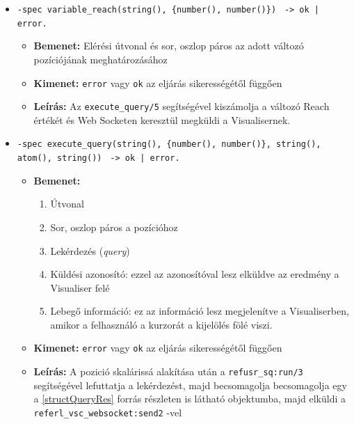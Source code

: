 \begin{itemize}
    
    \item \lstinline|-spec variable_reach(string(), {number(), number()})| \lstinline{ -> ok | error.}
    \begin{itemize}
        \item \textbf{Bemenet:} Elérési útvonal és sor, oszlop páros az adott változó pozíciójának meghatározásához
        \item \textbf{Kimenet:} \lstinline{error} vagy \lstinline{ok} az eljárás sikerességétől függően
        \item \textbf{Leírás:} Az \lstinline{execute_query/5} segítségével kiszámolja a változó Reach értékét és Web Socketen keresztül megküldi a Visualisernek.
    \end{itemize}
    \item \lstinline|-spec execute_query(string(), {number(), number()}, string(), atom(), string())| \lstinline{ -> ok | error.}
    \begin{itemize}
        \item \textbf{Bemenet:}
        \begin{enumerate}
            \item Útvonal
            \item Sor, oszlop páros a pozícióhoz
            \item Lekérdezés (\textit{query})
            \item Küldési azonosító: ezzel az azonosítóval lesz elküldve az eredmény a Visualiser felé
            \item Lebegő információ: ez az információ lesz megjelenítve a Visualiserben, amikor a felhasználó a kurzorát a kijelölés fölé viszi.
        \end{enumerate}
        \item \textbf{Kimenet:} \lstinline{error} vagy \lstinline{ok} az eljárás sikerességétől függően
        \item \textbf{Leírás:} A pozició skalárissá alakítása után a \lstinline{refusr_sq:run/3} segítségével lefuttatja a lekérdezést, majd becsomagolja becsomagolja egy a \ref{structQueryRes} forrás részleten is látható objektumba, majd elküldi a \lstinline{referl_vsc_websocket:send2}  -vel
    \end{itemize}
    



\end{itemize}
